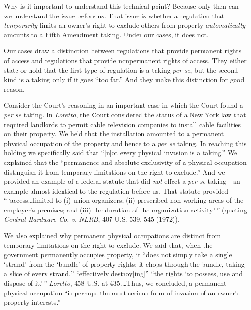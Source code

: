 Why is it important to understand this technical point? Because only then can we
understand the issue before us. That issue is whether a regulation that
\textit{temporarily} limits an owner's right to exclude others from property
\textit{automatically} amounts to a Fifth Amendment taking. Under our cases, it
does not.



Our cases draw a distinction between regulations that provide permanent rights
of access and regulations that provide nonpermanent rights of access. They
either state or hold that the first type of regulation is a taking \textit{per
se}, but the second kind is a taking only if it goes ``too far.'' And they make
this distinction for good reason.


Consider the Court's reasoning in an important case in which the Court found a
\textit{per se} taking. In \textit{Loretto}, the Court considered the status of
a New York law that required landlords to permit cable television companies to
install cable facilities on their property. We held that the installation
amounted to a permanent physical occupation of the property and hence to a
\textit{per se} taking. In reaching this holding we specifically said that
``[n]ot every physical invasion is a taking.'' We explained that the
``permanence and absolute exclusivity of a physical occupation distinguish it
from temporary limitations on the right to exclude.'' And we provided an example
of a federal statute that did \textit{not} effect a \textit{per se} taking---an
example almost identical to the regulation before us. That statute provided
``\,`access\ldots limited to (i) union organizers; (ii) prescribed non-working
areas of the employer's premises; and (iii) the duration of the organization
activity.'\,'' (quoting \textit{Central Hardware Co. v. NLRB}, 407 U.S. 539, 545
(1972)).


We also explained why permanent physical occupations are distinct from temporary
limitations on the right to exclude. We said that, when the government
permanently occupies property, it ``does not simply take a single `strand' from
the `bundle' of property rights: it chops through the bundle, taking a slice of
every strand,'' ``effectively destroy[ing]'' ``the rights `to possess, use and
dispose of it.'\,'' \textit{Loretto}, 458 U.S. at 435.\ldots Thus, we concluded,
a permanent physical occupation ``is perhaps the most serious form of invasion
of an owner's property interests.'' 


